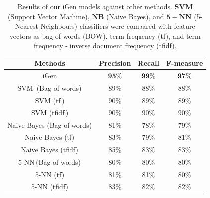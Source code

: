 \begin{table}[!tb]
	\centering
	\begin{tabular}{|c|c|c|c|}
		\hline
		\multicolumn{1}{|c|}{\textbf{Methods}} & \multicolumn{1}{c}{\textbf{Precision}} & \multicolumn{1}{|c|}{\textbf{Recall}} & \multicolumn{1}{|c|}{\textbf{F-measure}}\\
		\hline
		iGen & $\mathbf{95\%}$ & $\mathbf{99\%}$ & $\mathbf{97\%}$ \\
		\hline
		SVM \,\footnotemark[1] (Bag of words) & 89\% & 88\% & 88\% \\
		\hline
		SVM (tf\,\footnotemark[2]) &  90\% & 89\% & 89\% \\
		\hline
		SVM (tfidf\,\footnotemark[3]) &  90\% & 90\% & 90\% \\
		\hline
		Naive Bayes (Bag of words) & 81\% & 78\% & 79\% \\ %
		\hline
		Naive Bayes (tf) &  83\% & 79\% & 81\% \\
		\hline
		Naive Bayes (tfidf) &  85\% & 83\% & 83\% \\
		\hline
		5-NN\,\footnotemark[4] (Bag of words) & 80\% & 80\% & 80\% \\ %
		\hline
		5-NN (tf) &  81\% & 81\% & 80\% \\
		\hline
		5-NN (tfidf) &  83\% & 82\% & 82\% \\[1ex] %
		
		
		
		\hline
	\end{tabular}
	\caption[]{Results of our iGen models against other methods. $\mathbf{SVM}$ (Support Vector Machine), $\mathbf{NB}$ (Naive Bayes), and $\mathbf{5-NN}$ (5-Nearest Neighbours) classifiers were compared with feature vectors as bag of words (BOW), term frequency (tf), and term frequency - inverse document frequency (tfidf). }
	\label{table:methodcompare}
\end{table}


